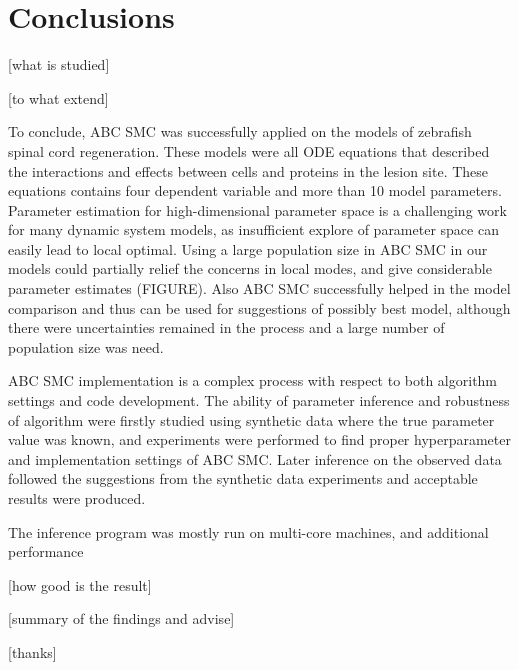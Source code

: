 \chapter{Conclusions}

 [what is studied]

 [to what extend]

 To conclude, ABC SMC was successfully applied on the models of zebrafish spinal cord regeneration. These models were all ODE equations that described the interactions and effects between cells and proteins in the lesion site. These equations contains four dependent variable and more than 10 model parameters.  Parameter estimation for high-dimensional parameter space is a challenging work for many dynamic system models, as insufficient explore of parameter space can easily lead to local optimal. Using a large population size in ABC SMC in our models could partially relief the concerns in local modes, and give considerable parameter estimates (FIGURE). Also ABC SMC successfully helped in the model comparison and thus can be used for suggestions of possibly best model, although there were uncertainties remained in the process and a large number of population size was need.

 ABC SMC implementation is a complex process with respect to both algorithm settings and code development. The ability of parameter inference and robustness of algorithm were firstly studied using synthetic data where the true parameter value was known, and experiments were performed to find proper hyperparameter and implementation settings of ABC SMC. Later inference on the observed data followed the suggestions from the synthetic data experiments and acceptable results were produced.

 The inference program was mostly run on multi-core machines, and additional performance 

 [how good is the result]

 [summary of the findings and advise]

 [thanks]